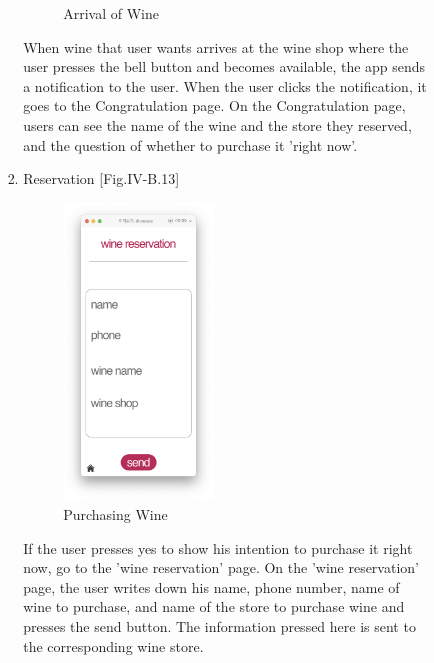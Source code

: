 \documentclass[conference]{IEEEtran}
\numberwithin{figure}{subsection}
\begin{document}
\begin{enumerate}
\begin{enumerate}
\begin{enumerate}
\begin{enumerate}
\begin{figure}[htb!]
                    \caption{Arrival of Wine}
                \end{figure}
                When wine that user wants arrives at the wine shop where the user presses the bell button and becomes available, the app sends a notification to the user. When the user clicks the notification, it goes to the Congratulation page. On the Congratulation page, users can see the name of the wine and the store they reserved, and the question of whether to purchase it 'right now'.\\
                \item Reservation [Fig.IV-B.13]\\
                \begin{figure}[htb!]
                    \centerline{\includegraphics[width=4cm]{winebuy.png}}
                    \caption{Purchasing Wine}
                \end{figure}
                If the user presses yes to show his intention to purchase it right now, go to the 'wine reservation' page. On the 'wine reservation' page, the user writes down his name, phone number, name of wine to purchase, and name of the store to purchase wine and presses the send button. The information pressed here is sent to the corresponding wine store. \\
            \end{enumerate}
            

\end{enumerate}
\end{enumerate}
\end{enumerate}
\end{document}
